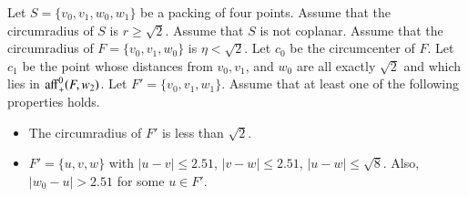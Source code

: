 \begin{tarskidata}
\begin{tarski}

\begin{lemma}
\end{lemma}
%
\end{tarski}







\begin{tarski}

\begin{lemma}
Let $S=\{v_0,v_1,w_0,w_1\}$ be a packing of four points.
Assume that the circumradius of $S$ is $r\ge \sqrt2$.  Assume
that $S$ is not coplanar.   Assume
that the circumradius of $F=\{v_0,v_1,w_0\}$ is
  $\eta < \sqrt2$.   Let $c_0$ be the circumcenter of $F$.
Let $c_1$ be the point whose distances from $v_0,v_1$, and $w_0$ are
all exactly $\sqrt2$ and which lies in
${\operatorname{aff}}^0_+(F,w_2)$.
Let $F'=\{v_0,v_1,w_1\}$.  Assume that at least one of
the following
properties holds.
\begin{itemize}
  \item The circumradius of $F'$ is less than $\sqrt2$.
  \item $F'=\{u,v,w\}$ with $|u-v| \le 2.51$, $|v-w|\le 2.51$,
        $|u-w|\le\sqrt8$. Also, $|w_0-u|>2.51$ for some $u\in F'$.
\end{itemize}


\end{lemma}
\end{tarski}
\end{tarskidata}
